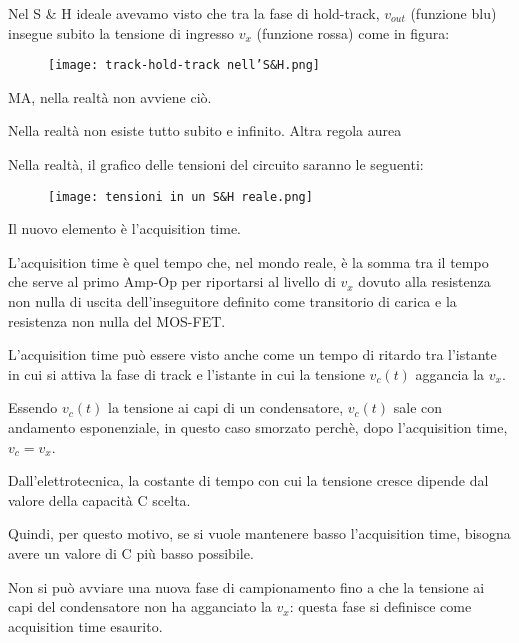 Nel S \& H ideale avevamo visto che tra la fase di hold-track, 
$v_{out}$ (funzione blu) insegue subito la tensione di ingresso $v_x$ (funzione rossa) come in figura: 


\begin{figure}[h]
    \centering
    \texttt{[image: track-hold-track nell'S\&H.png]}
\end{figure}

MA, nella realtà non avviene ciò. \newline 

\begin{tcolorbox}
    Nella realtà non esiste tutto subito e infinito. Altra regola aurea
\end{tcolorbox}

Nella realtà, il grafico delle tensioni del circuito saranno le seguenti: 

\begin{figure}[h]
    \centering
    \texttt{[image: tensioni in un S\&H reale.png]}
\end{figure}

Il nuovo elemento è l'acquisition time. \newline 

L'acquisition time è quel tempo che, nel mondo reale, 
è la somma tra il tempo che serve al primo Amp-Op per riportarsi al livello di $v_x$ 
dovuto alla resistenza non nulla di uscita dell'inseguitore definito come transitorio di carica 
e la resistenza non nulla del MOS-FET. \newline 

L'acquisition time può essere visto anche come un tempo di ritardo tra l'istante in cui si attiva 
la fase di track e l'istante in cui la tensione $v_c (t)$ aggancia la $v_x$. \newline 

Essendo $v_c (t)$ la tensione ai capi di un condensatore, 
$v_c (t)$ sale con andamento esponenziale, in questo caso smorzato 
perchè, dopo l'acquisition time,  $v_c = v_x$. \newline 

Dall'elettrotecnica, la costante di tempo con cui la tensione cresce dipende dal valore della capacità C scelta. \newline 

Quindi, per questo motivo, se si vuole mantenere basso l'acquisition time, bisogna avere un valore di C più basso possibile. \newline 

Non si può avviare una nuova fase di campionamento fino a che la tensione ai capi del condensatore non ha agganciato la $v_x$: 
questa fase si definisce come acquisition time esaurito. \newline 

